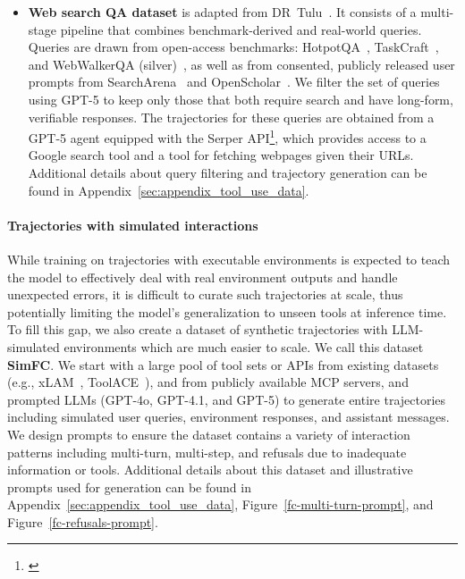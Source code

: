 \documentclass[table]{ai2style/ai2}
\begin{document}
{{\begin{itemize}
    \item \textbf{Web search QA dataset} is adapted from DR~Tulu~\citep{drtulu}. It consists of a multi-stage pipeline that combines benchmark-derived and real-world queries. Queries are drawn from open-access benchmarks: HotpotQA~\citep{Yang2018HotpotQAAD}, TaskCraft~\citep{Shi2025TaskCraftAG}, and WebWalkerQA (silver)~\citep{wu-etal-2025-webwalker}, as well as from consented, publicly released user prompts from SearchArena~\citep{Miroyan2025SearchAA} and OpenScholar~\citep{Asai2024OpenScholarSS}. We filter the set of queries using GPT-5 to keep only those that both require search and have long-form, verifiable responses. The trajectories for these queries are obtained from a GPT-5 agent equipped with the Serper API\footnote{\href{https://serper.dev/}{}}, which provides access to a Google search tool and a tool for fetching webpages given their URLs. Additional details about query filtering and trajectory generation can be found in Appendix~\ref{sec:appendix_tool_use_data}.
\end{itemize}

\paragraph{Trajectories with simulated interactions} While training on trajectories with executable environments is expected to teach the model to effectively deal with real environment outputs and handle unexpected errors, it is difficult to curate such trajectories at scale, thus potentially limiting the model's generalization to unseen tools at inference time. To fill this gap, we also create a dataset of synthetic trajectories with LLM-simulated environments which are much easier to scale. We call this dataset \textbf{SimFC}. We start with a large pool of tool sets or APIs from existing datasets (e.g., xLAM~\citep{Liu2024APIGenAP}, ToolACE~\citep{Liu2024ToolACEWT}), and from publicly available MCP servers, and prompted LLMs (GPT-4o, GPT-4.1, and GPT-5) to generate entire trajectories including simulated user queries, environment responses, and assistant messages. We design prompts to ensure the dataset contains a variety of interaction patterns including multi-turn, multi-step, and refusals due to inadequate information or tools. Additional details about this dataset and illustrative prompts used for generation can be found in Appendix~\ref{sec:appendix_tool_use_data}, Figure~\ref{fc-multi-turn-prompt}, and Figure~\ref{fc-refusals-prompt}.

}}
\end{document}
